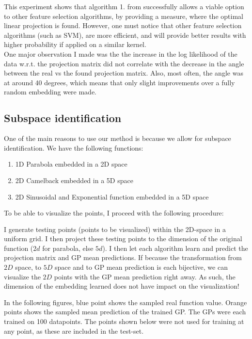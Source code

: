  This experiment shows that algorithm 1. from \citep{Tripathy} successfully allows a viable option to other feature selection algorithms, by providing a measure, where the optimal linear projection is found. 
 However, one must notice that other feature selection algorithms (such as SVM), are more efficient, and will provide better results with higher probability if applied on a similar kernel. \\
 
 One major observation I made was the the increase in the log likelihood of the data w.r.t. the projection matrix did not correlate with the decrease in the angle between the real vs the found projection matrix.
 Also, most often, the angle was at around 40 degrees, which means that only slight improvements over a fully random embedding were made.


\subsection{Subspace identification}
One of the main reasons to use our method is because we allow for subspace identification.
We have the following functions:

\begin{enumerate}
\item 1D Parabola embedded in a 2D space
\item 2D Camelback embedded in a 5D space
\item 2D Sinusoidal and Exponential function embedded in a 5D space
\end{enumerate}

To be able to visualize the points, I proceed with the following procedure:

I generate testing points (points to be visualized) within the 2D-space in a uniform grid.
I then project these testing points to the dimension of the original function ($2d$ for parabola, else $5d$).
I then let each algorithm learn and predict the projection matrix and GP mean predictions.
If because the transformation from $2D$ space, to $5D$ space and to GP mean prediction is each bijective, we can visualize the $2D$ points with the GP mean prediction right away.
As such, the dimension of the embedding learned does not have impact on the visualization!

In the following figures, blue point shows the sampled real function value.
Orange points shows the sampled mean prediction of the trained GP.
The GPs were each trained on 100 datapoints. 
The points shown below were not used for training at any point, as these are included in the test-set.

